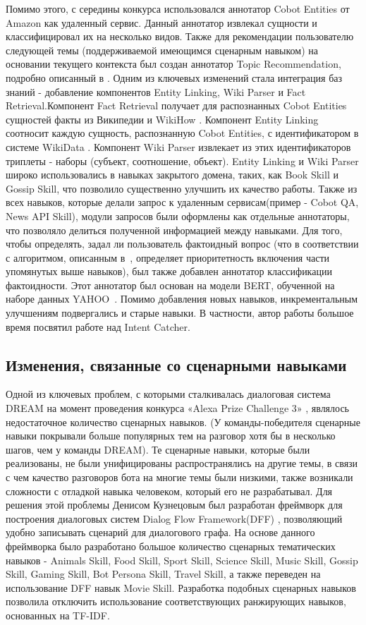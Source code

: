 Помимо этого, с середины конкурса использовался аннотатор Cobot Entities от Amazon как удаленный сервис. Данный аннотатор извлекал сущности и классифицировал их на несколько видов.
Также для рекомендации пользователю следующей темы (поддерживаемой имеющимся сценарным навыком) на основании текущего контекста был создан аннотатор Topic Recommendation, подробно описанный в \cite{dream2}.
Одним из ключевых изменений стала интеграция баз знаний - добавление компонентов Entity Linking, Wiki Parser и Fact Retrieval.Компонент Fact Retrieval получает для распознанных Cobot Entities сущностей факты из Википедии и WikiHow \cite{wikihow}.  Компонент Entity Linking соотносит каждую сущность, распознанную Cobot Entities, с идентификатором в системе WikiData \cite{vrandei_2014}. Компонент Wiki Parser извлекает из этих идентификаторов триплеты - наборы (субъект, соотношение, объект). Entity Linking и Wiki Parser широко использовались в навыках закрытого домена, таких, как Book Skill и Gossip Skill, что позволило существенно улучшить их качество работы.
Также из всех навыков, которые делали запрос к удаленным сервисам(пример -  Cobot QA, News API Skill), модули запросов были оформлены как отдельные аннотаторы, что позволяло делиться полученной информацией между навыками.
Для того, чтобы определять, задал ли пользователь фактоидный вопрос (что в соответствии с алгоритмом, описанным в~\cite{dream2}, определяет приоритетность включения части упомянутых выше навыков), был также добавлен аннотатор классификации фактоидности. Этот аннотатор был основан на модели BERT, обученной на наборе данных YAHOO~\cite{yahoo_dataset}.
Помимо добавления новых навыков, инкрементальным улучшениям подвергались и старые навыки. В частности, автор работы большое время посвятил работе над Intent Catcher. 

\subsection{Изменения, связанные со сценарными навыками}
Одной из ключевых проблем, с которыми сталкивалась диалоговая система {DREAM} на момент проведения конкурса «Alexa Prize Challenge 3» , являлось недостаточное количество сценарных навыков. (У команды-победителя сценарные навыки покрывали больше популярных тем на разговор хотя бы в несколько шагов, чем у команды DREAM). Те сценарные навыки, которые были реализованы, не были унифицированы распространялись на другие темы, в связи с чем качество разговоров бота на многие темы были низкими, также возникали сложности с отладкой навыка человеком, который его не разрабатывал. Для решения этой проблемы Денисом Кузнецовым был разработан фреймворк для построения диалоговых систем Dialog Flow Framework(DFF) \cite{dff}, позволяющий удобно записывать сценарий для диалогового графа. На основе данного фреймворка было разработано большое количество сценарных тематических навыков - Animals Skill, Food Skill, Sport Skill, Science Skill, Music Skill, Gossip Skill, Gaming Skill, Bot Persona Skill, Travel Skill, а также переведен на использование DFF навык Movie Skill. Разработка подобных сценарных навыков позволила отключить использование соответствующих ранжирующих навыков, основанных на TF-IDF.

